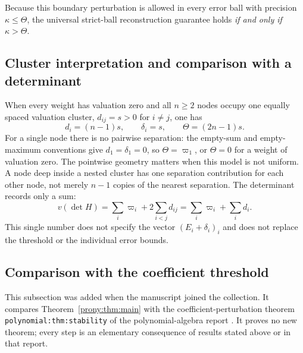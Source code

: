 \documentclass[11pt,letterpaper]{article}
\theoremstyle{definition}
\theoremstyle{remark}
\newcommand{\lbl}[1]{\nolinkurl{#1}}%
\begin{document}
Because this boundary perturbation is allowed in every error ball with
precision $\kappa\le\Theta$, the universal strict-ball reconstruction
guarantee holds \emph{if and only if} $\kappa>\Theta$.

\subsection{Cluster interpretation and comparison with a determinant}
When every weight has valuation zero and all $n\ge2$ nodes occupy one equally
spaced valuation cluster, $d_{ij}=s>0$ for $i\ne j$, one has
\[
 d_i=(n-1)s,\qquad \delta_i=s,\qquad \Theta=(2n-1)s.
\]
For a single node there is no pairwise separation: the empty-sum and
empty-maximum conventions give $d_1=\delta_1=0$, so
$\Theta=\varpi_1$, or $\Theta=0$ for a weight of valuation zero.
The pointwise geometry matters when this model is not uniform. A node deep
inside a nested cluster has one separation contribution for each other
node, not merely $n-1$ copies of the nearest separation.
The determinant records only a sum:
\begin{equation}\label{prony:eq:detval}
 v(\det H)=\sum_i\varpi_i+2\sum_{i<j}d_{ij}
           =\sum_i\varpi_i+\sum_i d_i.
\end{equation}
This single number does not specify the vector $(E_i+\delta_i)_i$ and does not
replace the threshold or the individual error bounds.

\subsection{Comparison with the coefficient threshold}
\label{prony:subsec:coefficient}
This subsection was added when the manuscript joined the collection. It
compares Theorem~\ref{prony:thm:main} with the coefficient-perturbation
theorem \lbl{polynomial:thm:stability} of the polynomial-algebra report
\cite{RepoPoly}. It proves no new theorem; every step is an elementary
consequence of results stated above or in that report.
\end{document}
